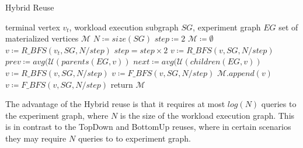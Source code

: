 \begin{algorithm}[h]
\caption{Hybrid Reuse}\label{algorithm-hybrid}
\begin{algorithmic}[1]
\Require terminal vertex $v_t$, workload execution subgraph  $SG$, experiment graph $EG$ 
\Ensure set of materialized vertices $\mathcal{M}$ 
\State $N \coloneqq size(SG)$
\State $step \coloneqq 2$
\State $\mathcal{M} \coloneqq \emptyset$
\State $v \coloneqq R\_BFS(v_t, SG, N/step)$
		\State $step = step \times 2$
				\State $v \coloneqq R\_BFS(v, SG, N/step)$
				\State $prev \coloneqq avg (\mathcal{U}(parents(EG, v))$
				\State $next \coloneqq avg (\mathcal{U}(children(EG, v))$
						 \State $v \coloneqq R\_BFS(v, SG, N/step)$
				\Else
					\State $v \coloneqq F\_BFS(v, SG, N/step)$
				\EndIf
				\State $\mathcal{M}.append(v)$
				\State $v \coloneqq F\_BFS(v, SG, N/step)$
		\EndIf
\EndWhile
\State return $\mathcal{M}$
\end{algorithmic}
\end{algorithm}
The advantage of the Hybrid reuse is that it requires at most $log(N)$ queries to the experiment graph, where $N$ is the size of the workload execution graph.
This is in contrast to the TopDown and BottomUp reuses, where in certain scenarios they may require $N$ queries to to experiment graph.

